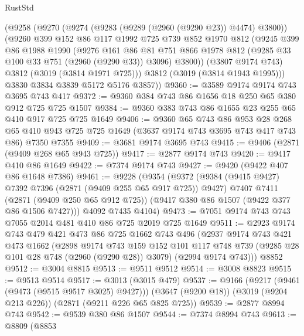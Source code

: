 \begin{lexlean}{RustStd}
\begin{coremodule}
      (@9258
        (@9270
          (@9274 (@9283 (@9289 (@2960 (@9290 @23)) @4474) @3800))
          (@9260
            @399
            @152
            @86
            @117
            @1992
            @725
            @739
            @852
            @1970
            @812
            (@9245
              @399
              @86
              @1988
              @1990
              (@9276
                @161
                @86
                @81
                @751
                @866
                @1978
                @812
                (@9285 @33 @100 @33 @751 (@2960 (@9290 @33)) @3096)
                @3800))
            (@3807 @9174 @743)
            @3812
            (@3019 (@3814 @1971 @725)))
          @3812
          (@3019 (@3814 @1943 @1995)))
        @3830
        @3834
        @3839
        @5172
        @5176
        @3857))
@9360 := @3589 @9174 @9174 @743 @3695 @743 @417
@9372 := @9360 @384 @743 @86 @1656 @18 @250 @65 @380 @912 @725 @725 @1507
@9384 := @9360 @383 @743 @86 @1655 @23 @255 @65 @410 @917 @725 @725 @1649
@9406 := @9360
    @65
    @743
    @86
    @953
    @28
    @268
    @65
    @410
    @943
    @725
    @725
    @1649
    (@3637 @9174 @743 @3695 @743 @417 @743 @86)
    @7350
    @7355
@9409 := @3681 @9174 @3695 @743
@9415 := @9406 (@2871 (@9409 @268 @65 @943 @725))
@9417 := @2877 @9174 @743
@9420 := @9417 @410 @86 @1649
@9422 := @7374 @9174 @743
@9427 := @9420 (@9422 @407 @86 @1648 @7386)
@9461 := @9228
    (@9354
      (@9372
        (@9384 (@9415 @9427) @7392 @7396 (@2871 (@9409 @255 @65 @917 @725)) @9427)
        @7407
        @7411
        (@2871 (@9409 @250 @65 @912 @725))
        (@9417 @380 @86 @1507 (@9422 @377 @86 @1506 @7427)))
      @4092
      @7435
      @4104)
@9473 := @7051 @9174 @743 @743 @7055 @2014 @481 @410 @86 @725 @2019 @725 @1649
@9511 := @2923
    @9174
    @743
    @479
    @421
    @473
    @86
    @725
    @1662
    @743
    @496
    (@2937
      @9174
      @743
      @421
      @473
      @1662
      (@2898
        @9174
        @743
        @159
        @152
        @101
        @117
        @748
        @739
        (@9285 @28 @101 @28 @748 (@2960 (@9290 @28)) @3079)
        (@2994 @9174 @743)))
    @8852
@9512 := @3004 @8815
@9513 := @9511 @9512
@9514 := @3008 @8823
@9515 := @9513 @9514
@9517 := @3013 (@3015 @479)
@9537 := @9166
    (@9217 (@9461 (@9473 (@9515 @9517 @3025) @9427)))
    (@3647 (@9200 @18))
    (@3019 (@9204 @213 @226))
    (@2871 (@9211 @226 @65 @825 @725))
@9539 := @2877 @8994 @743
@9542 := @9539 @380 @86 @1507
@9544 := @7374 @8994 @743
@9613 := @8809
    (@8853

\end{coremodule}
\end{lexlean}
